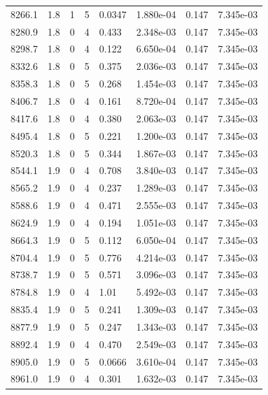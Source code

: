 \documentclass[preview]{standalone}
\begin{document}
{{{{{{{{{{{{{{{\begin{tabular}{L{1.2cm}C{1.2cm} C{0.3cm}C{0.5cm} C{1.4cm}C{1.4cm} C{1.4cm}C{1.4cm}}
  8266.1  &   1.8  & 1     &  5 &  0.0347  & 1.880e-04  & 0.147 &  7.345e-03   \\ 
  8280.9  &   1.8  & 0     &  4 &  0.433  & 2.348e-03  & 0.147 &  7.345e-03   \\ 
  8298.7  &   1.8  & 0     &  4 &  0.122  & 6.650e-04  & 0.147 &  7.345e-03   \\ 
  8332.6  &   1.8  & 0     &  5 &  0.375  & 2.036e-03  & 0.147 &  7.345e-03   \\ 
  8358.3  &   1.8  & 0     &  5 &  0.268  & 1.454e-03  & 0.147 &  7.345e-03   \\ 
  8406.7  &   1.8  & 0     &  4 &  0.161  & 8.720e-04  & 0.147 &  7.345e-03   \\ 
  8417.6  &   1.8  & 0     &  4 &  0.380  & 2.063e-03  & 0.147 &  7.345e-03   \\ 
  8495.4  &   1.8  & 0     &  5 &  0.221  & 1.200e-03  & 0.147 &  7.345e-03   \\ 
  8520.3  &   1.8  & 0     &  5 &  0.344  & 1.867e-03  & 0.147 &  7.345e-03   \\ 
  8544.1  &   1.9  & 0     &  4 &  0.708  & 3.840e-03  & 0.147 &  7.345e-03   \\ 
  8565.2  &   1.9  & 0     &  4 &  0.237  & 1.289e-03  & 0.147 &  7.345e-03   \\ 
  8588.6  &   1.9  & 0     &  4 &  0.471  & 2.555e-03  & 0.147 &  7.345e-03   \\ 
  8624.9  &   1.9  & 0     &  4 &  0.194  & 1.051e-03  & 0.147 &  7.345e-03   \\ 
  8664.3  &   1.9  & 0     &  5 &  0.112  & 6.050e-04  & 0.147 &  7.345e-03   \\ 
  8704.4  &   1.9  & 0     &  5 &  0.776  & 4.214e-03  & 0.147 &  7.345e-03   \\ 
  8738.7  &   1.9  & 0     &  5 &  0.571  & 3.096e-03  & 0.147 &  7.345e-03   \\ 
  8784.8  &   1.9  & 0     &  4 &  1.01  & 5.492e-03  & 0.147 &  7.345e-03   \\ 
  8835.4  &   1.9  & 0     &  5 &  0.241  & 1.309e-03  & 0.147 &  7.345e-03   \\ 
  8877.9  &   1.9  & 0     &  5 &  0.247  & 1.343e-03  & 0.147 &  7.345e-03   \\ 
  8892.4  &   1.9  & 0     &  4 &  0.470  & 2.549e-03  & 0.147 &  7.345e-03   \\ 
  8905.0  &   1.9  & 0     &  5 &  0.0666  & 3.610e-04  & 0.147 &  7.345e-03   \\ 
  8961.0  &   1.9  & 0     &  4 &  0.301  & 1.632e-03  & 0.147 &  7.345e-03   \\ 

\end{tabular}}}}}}}}}}}}}}}}
\end{document}
